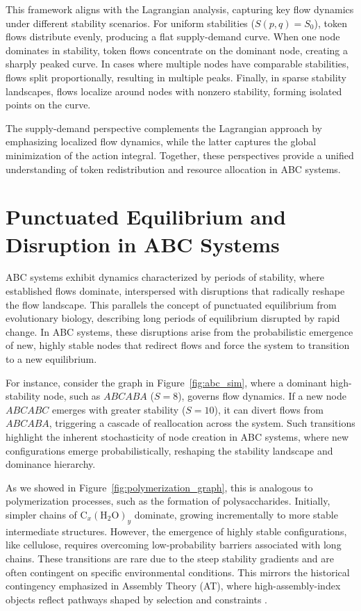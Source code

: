\documentclass[entropy,article,submit,pdftex,oneauthor]{Definitions/mdpi}
\begin{document}
This framework aligns with the Lagrangian analysis, capturing key flow dynamics under different stability scenarios. For uniform stabilities (\(S(p, q) = S_0\)), token flows distribute evenly, producing a flat supply-demand curve. When one node dominates in stability, token flows concentrate on the dominant node, creating a sharply peaked curve. In cases where multiple nodes have comparable stabilities, flows split proportionally, resulting in multiple peaks. Finally, in sparse stability landscapes, flows localize around nodes with nonzero stability, forming isolated points on the curve.

The supply-demand perspective complements the Lagrangian approach by emphasizing localized flow dynamics, while the latter captures the global minimization of the action integral. Together, these perspectives provide a unified understanding of token redistribution and resource allocation in ABC systems.

\section{Punctuated Equilibrium and Disruption in ABC Systems}

ABC systems exhibit dynamics characterized by periods of stability, where established flows dominate, interspersed with disruptions that radically reshape the flow landscape. This parallels the concept of punctuated equilibrium from evolutionary biology, describing long periods of equilibrium disrupted by rapid change. In ABC systems, these disruptions arise from the probabilistic emergence of new, highly stable nodes that redirect flows and force the system to transition to a new equilibrium.

For instance, consider the graph in Figure~\ref{fig:abc_sim}, where a dominant high-stability node, such as \( ABCABA \) (\( S = 8 \)), governs flow dynamics. If a new node \( ABCABC \) emerges with greater stability (\( S = 10 \)), it can divert flows from \( ABCABA \), triggering a cascade of reallocation across the system. Such transitions highlight the inherent stochasticity of node creation in ABC systems, where new configurations emerge probabilistically, reshaping the stability landscape and dominance hierarchy.

As we showed in Figure~\ref{fig:polymerization_graph}, this is analogous to polymerization processes, such as the formation of polysaccharides. Initially, simpler chains of \( \text{C}_x(\text{H}_2\text{O})_y \) dominate, growing incrementally to more stable intermediate structures. However, the emergence of highly stable configurations, like cellulose, requires overcoming low-probability barriers associated with long chains. These transitions are rare due to the steep stability gradients and are often contingent on specific environmental conditions. This mirrors the historical contingency emphasized in Assembly Theory (AT), where high-assembly-index objects reflect pathways shaped by selection and constraints \cite{walker2023nature}.
\end{document}
